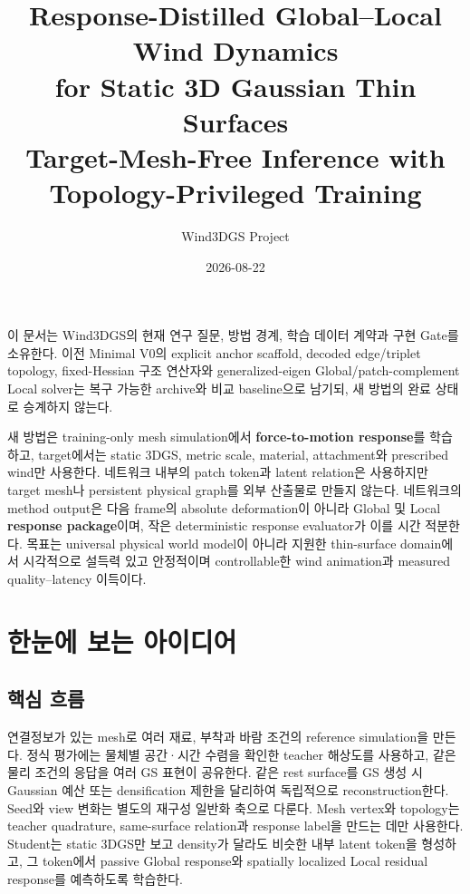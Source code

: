 \documentclass[11pt]{article}
\title{\textbf{Response-Distilled Global--Local Wind Dynamics}\\
for Static 3D Gaussian Thin Surfaces\\[0.35em]
\large Target-Mesh-Free Inference with Topology-Privileged Training}
\author{Wind3DGS Project}
\date{2026-08-22}
\begin{document}
\maketitle

\begin{tcolorbox}[colback=CoreLight,colframe=CoreBlue,title=Canonical direction as of 2026-08-22,fonttitle=\bfseries]
이 문서는 Wind3DGS의 현재 연구 질문, 방법 경계, 학습 데이터 계약과 구현 Gate를 소유한다.
이전 Minimal V0의 explicit anchor scaffold, decoded edge/triplet topology, fixed-Hessian 구조 연산자와
generalized-eigen Global/patch-complement Local solver는 복구 가능한 archive와 비교 baseline으로 남기되,
새 방법의 완료 상태로 승계하지 않는다.

새 방법은 training-only mesh simulation에서 \textbf{force-to-motion response}를 학습하고,
target에서는 static 3DGS, metric scale, material, attachment와 prescribed wind만 사용한다.
네트워크 내부의 patch token과 latent relation은 사용하지만 target mesh나 persistent physical graph를
외부 산출물로 만들지 않는다. 네트워크의 method output은 다음 frame의 absolute deformation이 아니라
Global 및 Local \textbf{response package}이며, 작은 deterministic response evaluator가 이를 시간 적분한다.
목표는 universal physical world model이 아니라 지원한 thin-surface domain에서
시각적으로 설득력 있고 안정적이며 controllable한 wind animation과 measured quality--latency 이득이다.
\end{tcolorbox}

\tableofcontents
\newpage

\section{한눈에 보는 아이디어}

\subsection{핵심 흐름}

\begin{tcolorbox}[colback=SafeLight,colframe=SafeGreen,title=Training,fonttitle=\bfseries]
연결정보가 있는 mesh로 여러 재료, 부착과 바람 조건의 reference simulation을 만든다.
정식 평가에는 물체별 공간·시간 수렴을 확인한 teacher 해상도를 사용하고, 같은 물리 조건의 응답을
여러 GS 표현이 공유한다. 같은 rest surface를 GS 생성 시 Gaussian 예산 또는 densification 제한을
달리하여 독립적으로 reconstruction한다. Seed와 view 변화는 별도의 재구성 일반화 축으로 다룬다.
Mesh vertex와 topology는 teacher quadrature, same-surface relation과 response label을 만드는 데만 사용한다.
Student는 static 3DGS만 보고 density가 달라도 비슷한 내부 latent token을 형성하고,
그 token에서 passive Global response와 spatially localized Local residual response를 예측하도록 학습한다.
\end{tcolorbox}
\end{document}

